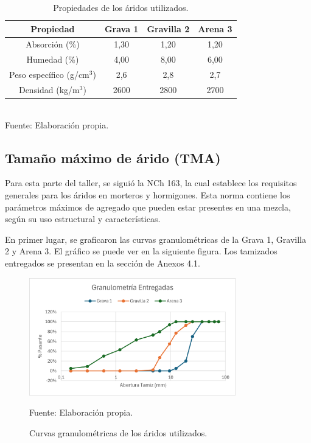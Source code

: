 \begin{table}[H]
\centering
\caption{Propiedades de los áridos utilizados.}
\begin{tabular}{|c|c|c|c|}
\hline
\textbf{Propiedad} & \textbf{Grava 1} & \textbf{Gravilla 2} & \textbf{Arena 3} \\ \hline
Absorción (\%) & 1,30 & 1,20 & 1,20 \\ \hline
Humedad (\%) & 4,00 & 8,00 & 6,00 \\ \hline
Peso específico (g/cm\(^3\)) & 2,6 & 2,8 & 2,7 \\ \hline
Densidad (kg/m\(^3\)) & 2600 & 2800 & 2700 \\ \hline
\end{tabular}
\\Fuente: Elaboración propia.
\end{table}


\subsection{Tamaño máximo de árido (TMA)}

Para esta parte del taller, se siguió la NCh 163, la cual establece los requisitos generales para los áridos en morteros y hormigones. Esta norma contiene los parámetros máximos de agregado que pueden estar presentes en una mezcla, según su uso estructural y características.

En primer lugar, se graficaron las curvas granulométricas de la Grava 1, Gravilla 2 y Arena 3. El gráfico se puede ver en la siguiente figura. Los tamizados entregados se presentan en la sección de Anexos 4.1.

\begin{figure}[H]
    \centering
    \includegraphics[width=0.8\textwidth]{GRAFICOS/granu_inicial.png}
    \caption{Curvas granulométricas de los áridos utilizados.}
    Fuente: Elaboración propia.
\end{figure}

